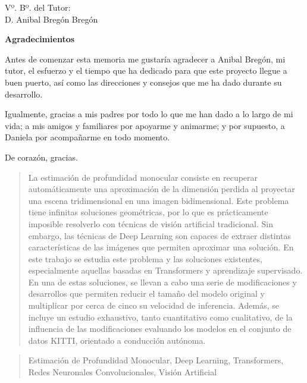\documentclass[a4paper,11pt,oneside]{memoir}
\begin{document}
Vº. Bº. del Tutor:\\[2cm]
D. Anibal Bregón Bregón


\newpage\null\thispagestyle{empty}\newpage

\thispagestyle{empty}

\textbf{Agradecimientos}

Antes de comenzar esta memoria me gustaría agradecer a Anibal Bregón, mi tutor, el esfuerzo y el tiempo que ha dedicado para que este proyecto llegue a buen puerto, así como las direcciones y consejos que me ha dado durante su desarrollo.

Igualmente, gracias a mis padres por todo lo que me han dado a lo largo de mi vida; a mis amigos y familiares por apoyarme y animarme; y por supuesto, a Daniela por acompañarme en todo momento.

De corazón, gracias.

\newpage\null\thispagestyle{empty}\newpage


\frontmatter

\renewcommand*\abstractname{Resumen}
\begin{abstract}
La estimación de profundidad monocular consiste en recuperar automáticamente una aproximación de la dimensión perdida al proyectar una escena tridimensional en una imagen bidimensional. Este problema tiene infinitas soluciones geométricas, por lo que es prácticamente imposible resolverlo con técnicas de visión artificial tradicional. Sin embargo, las técnicas de Deep Learning son capaces de extraer distintas características de las imágenes que permiten aproximar una solución. En este trabajo se estudia este problema y las soluciones existentes, especialmente aquellas basadas en Transformers y aprendizaje supervisado. En una de estas soluciones, se llevan a cabo una serie de modificaciones y desarrollos que permiten reducir el tamaño del modelo original y multiplicar por cerca de cinco su velocidad de inferencia. Además, se incluye un estudio exhaustivo, tanto cuantitativo como cualitativo, de la influencia de las modificaciones evaluando los modelos en el conjunto de datos KITTI, orientado a conducción autónoma.
\end{abstract}

\renewcommand*\abstractname{Descriptores}
\begin{abstract}
Estimación de Profundidad Monocular, Deep Learning, Transformers, Redes Neuronales Convolucionales, Visión Artificial
\end{abstract}
\end{document}

